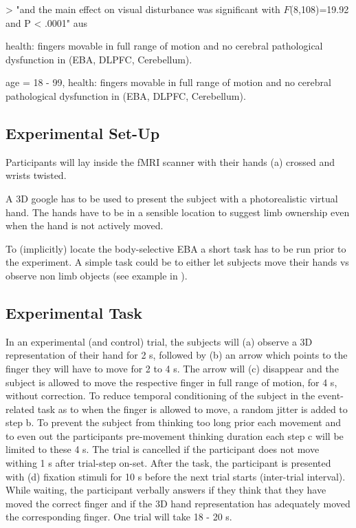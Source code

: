 \documentclass[man]{apa7}
\begin{document}
> "and the main effect on visual disturbance was significant with $F$(8,108)=19.92 and P < .0001"
aus \parencite{Wei2009}


health: fingers movable in full range of motion and no cerebral pathological dysfunction in (EBA, DLPFC, Cerebellum).

age = 18 - 99, health: fingers movable in full range of motion and no cerebral pathological dysfunction in (EBA, DLPFC, Cerebellum).



\subsection{Experimental Set-Up}

Participants will lay inside the fMRI scanner with their hands (a) crossed and wrists twisted.

A 3D google has to be used to present the subject with a photorealistic virtual hand. The hands have to be in a sensible location to suggest limb ownership even when the hand is not actively moved.

To (implicitly) locate the body-selective EBA a short task has to be run prior to the experiment. A simple task could be to either let subjects move their hands vs observe non limb objects (see example in \cite{Limanowski2016}).

\subsection{Experimental Task}

In an experimental (and control) trial, the subjects will (a) observe a 3D representation of their hand for 2 s, followed by (b) an arrow which points to the finger they will have to move for 2 to 4 s. The arrow will (c) disappear and the subject is allowed to move the respective finger in full range of motion, for 4 s, without correction. To reduce temporal conditioning of the subject in the event-related task as to when the finger is allowed to move, a random jitter is added to step b. To prevent the subject from thinking too long prior each movement and to even out the participants pre-movement thinking duration each step c will be limited to these 4 s. The trial is cancelled if the participant does not move withing 1 s after trial-step on-set. After the task, the participant is presented with (d) fixation stimuli for 10 s before the next trial starts (inter-trial interval). While waiting, the participant verbally answers if they think that they have moved the correct finger and if the 3D hand representation has adequately moved the corresponding finger. One trial will take 18 - 20 s.
\end{document}
